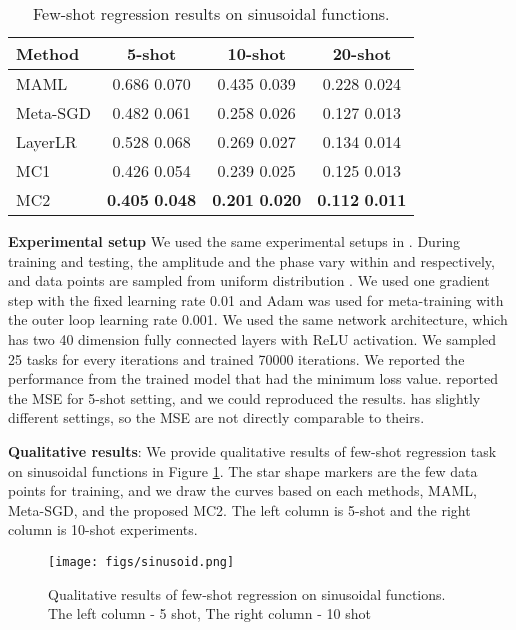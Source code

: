 \documentclass{article}
\begin{document}
\begin{table}[t]
\caption{Few-shot regression results on sinusoidal functions.}
\label{table:regression}
\begin{center}
\begin{small}
\begin{tabular}{lccc}
\toprule
Method & 5-shot & 10-shot & 20-shot \\
\midrule
MAML               & 0.686  0.070 & 0.435  0.039 & 0.228  0.024 \\
Meta-SGD           & 0.482  0.061 & 0.258  0.026 & 0.127  0.013 \\
LayerLR            & 0.528  0.068 & 0.269  0.027 & 0.134  0.014 \\
MC1                & 0.426  0.054 & 0.239  0.025 & 0.125  0.013 \\
MC2                & \textbf{0.405}  \textbf{0.048} & \textbf{0.201}  \textbf{0.020} & \textbf{0.112}  \textbf{0.011} \\
\bottomrule
\end{tabular}
\end{small}
\end{center}
\end{table}

\textbf{Experimental setup}
We used the same experimental setups in \cite{Finn-icml-2017}. During training and testing, the amplitude and the phase vary within  and  respectively, and data points are sampled from uniform distribution . We used one gradient step with the fixed learning rate 0.01 and Adam was used for meta-training with the outer loop learning rate 0.001. We used the same network architecture, which has two 40 dimension fully connected layers with ReLU activation. We sampled 25 tasks for every iterations and trained 70000 iterations. We reported the performance from the trained model that had the minimum loss value. \cite{Finn-icml-2017} reported the MSE for 5-shot setting, and we could reproduced the results. \cite{Li-arxiv-2017} has slightly different settings, so the MSE are not directly comparable to theirs.

\textbf{Qualitative results}: We provide qualitative results of few-shot regression task on sinusoidal functions in Figure \ref{fig:sinosoid}. The star shape markers are the few data points for training, and we draw the curves based on each methods, MAML, Meta-SGD, and the proposed MC2. The left column is 5-shot and the right column is 10-shot experiments.

\begin{figure}[t]
\begin{center}
\centerline{\texttt{[image: figs/sinusoid.png]}}
\caption{Qualitative results of few-shot regression on sinusoidal functions. The left column - 5 shot, The right column - 10 shot}
\label{fig:sinosoid}
\end{center}
\end{figure}
\end{document}
